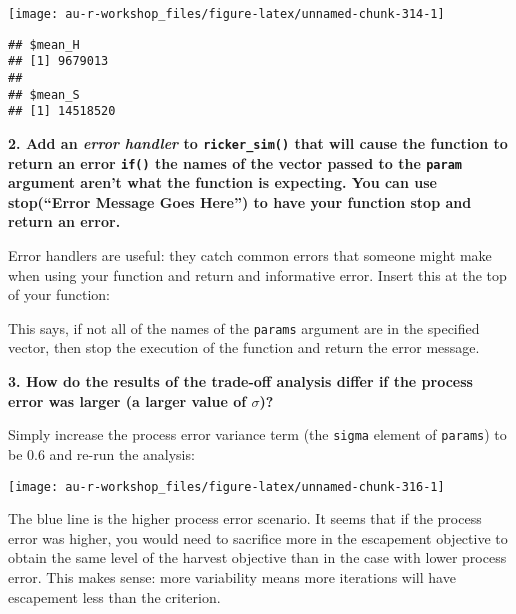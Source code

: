 \documentclass[]{book}
\newenvironment{Shaded}{\begin{snugshade}}{\end{snugshade}}
\newcommand{\KeywordTok}[1]{\textcolor[rgb]{0.13,0.29,0.53}{\textbf{#1}}}
\newcommand{\StringTok}[1]{\textcolor[rgb]{0.31,0.60,0.02}{#1}}
\newcommand{\ControlFlowTok}[1]{\textcolor[rgb]{0.13,0.29,0.53}{\textbf{#1}}}
\newcommand{\OperatorTok}[1]{\textcolor[rgb]{0.81,0.36,0.00}{\textbf{#1}}}
\newcommand{\NormalTok}[1]{#1}
\theoremstyle{definition}
\theoremstyle{definition}
\theoremstyle{definition}
\theoremstyle{remark}
\begin{document}
\begin{center}\texttt{[image: au-r-workshop\_files/figure-latex/unnamed-chunk-314-1]} \end{center}

\begin{verbatim}
## $mean_H
## [1] 9679013
## 
## $mean_S
## [1] 14518520
\end{verbatim}

\textbf{2. Add an \emph{error handler} to \texttt{ricker\_sim()} that
will cause the function to return an error \texttt{if()} the names of
the vector passed to the \texttt{param} argument aren't what the
function is expecting. You can use stop(``Error Message Goes Here'') to
have your function stop and return an error.}

Error handlers are useful: they catch common errors that someone might
make when using your function and return and informative error. Insert
this at the top of your function:

\begin{Shaded}
\end{Shaded}

This says, if not all of the names of the \texttt{params} argument are
in the specified vector, then stop the execution of the function and
return the error message.

\textbf{3. How do the results of the trade-off analysis differ if the
process error was larger (a larger value of \(\sigma\))?}

Simply increase the process error variance term (the \texttt{sigma}
element of \texttt{params}) to be 0.6 and re-run the analysis:

\begin{center}\texttt{[image: au-r-workshop\_files/figure-latex/unnamed-chunk-316-1]} \end{center}

The blue line is the higher process error scenario. It seems that if the
process error was higher, you would need to sacrifice more in the
escapement objective to obtain the same level of the harvest objective
than in the case with lower process error. This makes sense: more
variability means more iterations will have escapement less than the
criterion.
\end{document}
